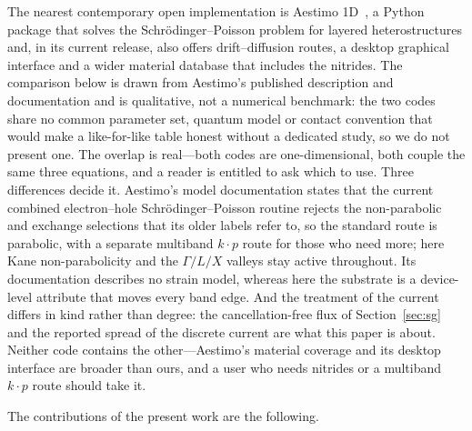 \documentclass[preprint,12pt]{elsarticle}
\begin{document}
The nearest contemporary open implementation is Aestimo
1D~\cite{Hebal2021,AestimoRepo}, a Python package that solves the
Schr\"odinger--Poisson problem for layered heterostructures and, in its
current release, also offers drift--diffusion routes, a desktop graphical
interface and a wider material database that includes the nitrides. The
comparison below is drawn from Aestimo's published description and
documentation and is qualitative, not a numerical benchmark: the two codes
share no common parameter set, quantum model or contact convention that would
make a like-for-like table honest without a dedicated study, so we do not
present one. The
overlap is real---both codes are one-dimensional, both couple the same three
equations, and a reader is entitled to ask which to use. Three differences
decide it. Aestimo's model documentation states that the current combined
electron--hole Schr\"odinger--Poisson routine rejects the non-parabolic and
exchange selections that its older labels refer to, so the standard route is
parabolic, with a separate multiband $k\cdot p$ route for those who need
more; here Kane non-parabolicity and the $\Gamma/L/X$ valleys stay active
throughout. Its documentation describes no strain model, whereas here the
substrate is a device-level attribute that moves every band edge. And the
treatment of the current differs in kind rather than degree: the
cancellation-free flux of Section~\ref{sec:sg} and the reported spread of the
discrete current are what this paper is about. Neither code contains the
other---Aestimo's material coverage and its desktop interface are broader than
ours, and a user who needs nitrides or a multiband $k\cdot p$ route should
take it.

The contributions of the present work are the following.
\end{document}
